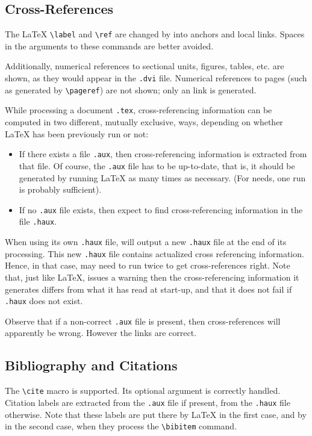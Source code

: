 \subsection{Cross-References}\label{cross}
The \LaTeX{} \verb+\label+ and \verb+\ref+ are changed by \hevea{}
into {\html} anchors and local links.
Spaces in the arguments to these commands are better avoided.


Additionally, numerical references to sectional units, figures,
tables, etc. are shown, as they would appear in the \texttt{.dvi}
file.
Numerical references to pages (such as generated by \verb+\pageref+)
are not shown; only an link is generated.

While processing a document \texttt{.tex},
cross-referencing information can be computed in two different, mutually
exclusive, ways, depending
on whether \LaTeX{} has been previously run or not:
\begin{itemize}
\item If there exists a file 
\texttt{.aux}, then cross-referencing information is extracted
from that file. Of course, the \texttt{.aux} file
has to be up-to-date, that is,
it should be generated by running \LaTeX{} as many times as necessary.
(For \hevea{} needs, one run is probably sufficient).
\item If no \texttt{.aux} file exists, then \hevea{}
expect to find cross-referencing information in the file
\texttt{.haux}.
\end{itemize}
When using its own \texttt{.haux} file,
\hevea{} will output a
new \texttt{.haux} file at the end of its processing.
This new  \texttt{.haux} file contains actualized
cross referencing information.
Hence, in that case, \hevea{} may need to run twice to get
cross-references right.
Note that, just like \LaTeX,
\hevea{} issues a warning then the cross-referencing information it
generates differs from what it has read at start-up, and that it does
not fail if \texttt{.haux} does not exist.


Observe that if a non-correct \texttt{.aux} file is
present, then cross-references will apparently be wrong. However the
links are correct.


\subsection{Bibliography and Citations}
The \verb+\cite+ macro is supported. Its optional argument is
correctly handled. Citation labels  are extracted from the
\texttt{.aux} file if present, from the \texttt{.haux} file otherwise.
Note that these labels are put there by \LaTeX{} in the first case,
and by \hevea{} in the second case, when they process the
\verb+\bibitem+ command.

